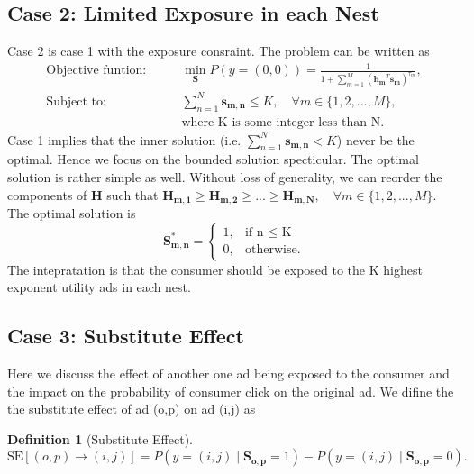 \documentclass[12pt]{article}
\theoremstyle{definition}
\newtheorem{definition}{Definition}[section]
\newcommand{\matr}[1]{\mathbf{#1}} %
\begin{document}
\begin{sloppypar}
\subsection{Case 2: Limited Exposure in each Nest}
Case 2 is case 1 with the exposure consraint. The problem can be written as
\begin{align} \label{case2}
    \text{Objective funtion:} \qquad &\min_{\matr{S}} P(y=(0,0)) = \frac{1}{1+\sum_{m=1}^{M}(\matr{h_m}^T \matr{s_m})^{\tau_m}},\nonumber \\
    \text{Subject to:} \qquad &\sum_{n=1}^{N}\matr{s_{m,n}} \leq K, \quad \forall m \in \{1,2,...,M\},\\ &\text{where K is some integer less than N}. \nonumber
\end{align}
Case 1 implies that the inner solution (i.e. $\sum_{n=1}^{N}\matr{s_{m,n}} < K$) never be the optimal. Hence we focus on the bounded solution specticular. The optimal solution is rather simple as well.
Without loss of generality, we can reorder the components of $\matr{H}$ such that $\matr{H_{m,1}} \geq \matr{H_{m,2}} \geq ... \geq \matr{H_{m,N}}, \quad \forall m \in \{1,2,...,M\}$. The optimal solution is
\begin{equation}
    \matr{S^*_{m,n}} = 
    \begin{cases}
        1, & \text{if n $\leq$ K} \\
        0, & \text{otherwise}.
    \end{cases}
\end{equation}
The intepratation is that the consumer should be exposed to the K highest exponent utility ads in each nest.

\subsection{Case 3: Substitute Effect}
Here we discuss the effect of another one ad being exposed to the consumer and the impact on the probability of consumer click on the original ad. We difine the the substitute effect of ad (o,p) on ad (i,j) as
\begin{definition}[Substitute Effect]
    \begin{equation*}
        \mathrm{SE}[(o,p) \rightarrow (i,j)] = P(y=(i,j) \mid \matr{S_{o,p}}=1) - P(y=(i,j) \mid \matr{S_{o,p}}=0).
    \end{equation*}
\end{definition}


\end{sloppypar}
\end{document}

